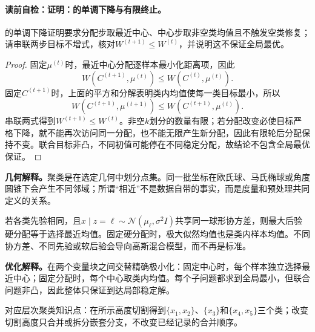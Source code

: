 \label{struct:V4-C02-CH13}
\paragraph{读前自检：证明：的单调下降与有限终止。}\kMeans{}的单调下降证明要求分配步取最近中心、中心步取非空类均值且不触发空类修复；请串联两步目标不增式，核对$W^{(t+1)}\le W^{(t)}$，并说明这不保证全局最优。\par

\begin{proof}
固定$\mu^{(t)}$时，最近中心分配逐样本最小化距离项，因此
\[
W(C^{(t+1)},\mu^{(t)})\leq W(C^{(t)},\mu^{(t)}).
\]
固定$C^{(t+1)}$时，上面的平方和分解表明类内均值使每一类目标最小，所以
\[
W(C^{(t+1)},\mu^{(t+1)})\leq W(C^{(t+1)},\mu^{(t)}).
\]
串联两式得到$W^{(t+1)}\leq W^{(t)}$。非空$k$划分的数量有限；若分配改变必使目标严格下降，就不能再次访问同一分配，也不能无限产生新分配，因此有限轮后分配保持不变。联合目标非凸，不同初值可能停在不同稳定分配，故结论不包含全局最优保证。
\end{proof}

\label{struct:V4-C02-CH14}
\begin{geometrybox}
\textbf{几何解释。}聚类是在选定几何中划分点集。同一批坐标在欧氏球、马氏椭球或角度圆锥下会产生不同邻域；所谓“相近”不是数据自带的事实，而是度量和预处理共同定义的关系。
\end{geometrybox}

\label{struct:V4-C02-CH15}
\begin{probabilitybox}
若各类先验相同，且$x\mid z=\ell\sim\mathcal N(\mu_\ell,\sigma^2I)$共享同一球形协方差，则最大后验硬分配等于选择最近均值。固定硬分配时，极大似然均值也是类内样本均值。不同协方差、不同先验或软后验会导向高斯混合模型，而不再是标准\kMeans{}。
\end{probabilitybox}

\label{struct:V4-C02-CH16}
\begin{optimizationbox}
\textbf{优化解释。}\kMeans{}在两个变量块之间交替精确极小化：固定中心时，每个样本独立选择最近中心；固定分配时，每个中心取类内均值。每个子问题都求到全局最小，但联合问题非凸，因此整体只保证到达局部稳定解。
\end{optimizationbox}

\label{struct:V4-C02-CH17}

对应层次聚类知识点：在所示高度切割得到$\{x_1,x_2\}$、$\{x_3\}$和$\{x_4,x_5\}$三个类；改变切割高度只合并或拆分嵌套分支，不改变已经记录的合并顺序。

